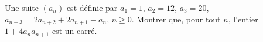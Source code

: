 Une suite $(a_n)$ est définie par $a_1 = 1$, $a_2 = 12$, $a_3 = 20$, $a_{n+3} = 2a_{n+2} + 2a_{n+1} - a_n$, $n \geq 0$. Montrer que, pour tout $n$, l'entier $1 + 4a_na_{n+1}$ est un carré.
